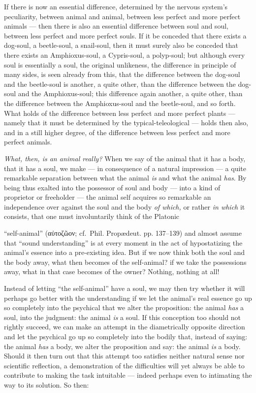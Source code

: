 \documentclass[12pt,a4paper]{book}
\begin{document}
If there is now an essential difference, determined by the nervous system's
peculiarity, between animal and animal, between less perfect and more perfect animals
--- then there is also an essential difference between soul and soul, between less
perfect and more perfect souls. If it be conceded that there exists a dog-soul, a
beetle-soul, a snail-soul, then it must surely also be conceded that there exists an
Amphioxus-soul, a Cypris-soul, a polyp-soul; but although every soul is essentially a
soul, the original unlikeness, the difference in principle of many sides, is seen
already from this, that the difference between the dog-soul and the beetle-soul is
another, a quite other, than the difference between the dog-soul and the
Amphioxus-soul; this difference again another, a quite other, than the difference
between the Amphioxus-soul and the beetle-soul, and so forth. What holds of the
difference between less perfect and more perfect plants --- namely that it must be
determined by the typical-teleological --- holds then also, and in a still higher
degree, of the difference between less perfect and more perfect animals.

\emph{What, then, is an animal really?} When we say of the animal that it has a body,
that it has a soul, we make --- in consequence of a natural impression --- a quite
remarkable separation between what the animal \emph{is} and what the animal
\emph{has}. By being thus exalted into the possessor of soul and body --- into a kind
of proprietor or freeholder --- the animal self acquires so remarkable an independence
over against the soul and the body \emph{of which,} or rather \emph{in which} it
consists, that one must involuntarily think of the Platonic

``self-animal'' (αὐτοζῶον; cf.\ Phil. Propædeut. pp. 137--139) and almost assume that
``sound understanding'' is at every moment in the act of hypostatizing the animal's
essence into a pre-existing idea. But if we now think both the soul and the body away,
what then becomes of the self-animal? if we take the possessions away, what in that
case becomes of the owner? Nothing, nothing at all!

Instead of letting ``the self-animal'' have a soul, we may then try whether it will
perhaps go better with the understanding if we let the animal's real essence go up so
completely into the psychical that we alter the proposition: the animal \emph{has} a
soul, into the judgment: the animal \emph{is} a soul. If this conception too should
not rightly succeed, we can make an attempt in the diametrically opposite direction
and let the psychical go up so completely into the bodily that, instead of saying:
the animal \emph{has} a body, we alter the proposition and say: the animal
\emph{is} a body. Should it then turn out that this attempt too satisfies neither
natural sense nor scientific reflection, a demonstration of the difficulties will yet
always be able to contribute to making the task intuitable --- indeed perhaps even to
intimating the way to its solution. So then:
\end{document}
